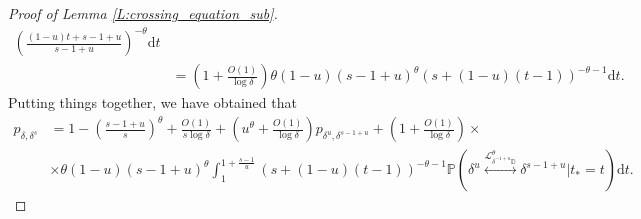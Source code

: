 \documentclass[11pt]{article}
\theoremstyle{remark}
\newcommand{\D}{\mathbb{D}}
\newcommand{\Lc}{\mathcal{L}}
\newcommand{\Prob}[1]{\mathbb{P} \left( #1 \right) }
\renewcommand{\d}{\mathrm{d}}
\numberwithin{equation}{section}
\begin{document}
\begin{proof}[Proof of Lemma \ref{L:crossing_equation_sub}]
\begin{align*}
\left( \frac{(1-u)t + s-1+u}{s-1+u} \right)^{-\theta} \d t \\
& = \left( 1 + \frac{O(1)}{\log \delta} \right) \theta (1-u) (s-1+u)^\theta (s + (1-u)(t-1))^{-\theta-1} \d t.
\end{align*}
Putting things together, we have obtained that
\begin{align*}
p_{\delta,\delta^s}
& = 1 - \left( \frac{s-1+u}{s} \right)^\theta + \frac{O(1)}{s \log \delta}
+ \left( u^\theta + \frac{O(1)}{\log \delta} \right) p_{\delta^u, \delta^{s-1+u}} + \left( 1 + \frac{O(1)}{\log \delta} \right) \times \\
& \times \theta (1-u) (s-1+u)^\theta
\int_1^{1 + \frac{s-1}{u}} (s + (1-u)(t-1))^{-\theta-1} \Prob{ \delta^u \overset{\Lc_{\delta^{-1+u} \D}^\theta}{\longleftrightarrow} \delta^{s-1+u} \Big\vert t_* = t} \d t.
\end{align*}


\end{proof}
\end{document}
